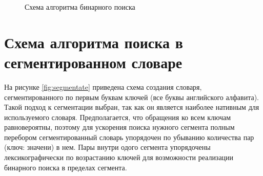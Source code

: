 \begin{figure}[h!]
	
	
	\caption{Схема алгоритма бинарного поиска}
	
	\label{fig:binary_search}
	
\end{figure}

\clearpage
\section{Схема алгоритма поиска в сегментированном словаре}

На рисунке \ref{fig:segmentate} приведена схема создания словаря, сегментированного по первым буквам ключей (все буквы английского алфавита). Такой подход к сегментации выбран, так как он является наиболее нативным для используемого словаря. Предполагается, что обращения ко всем ключам равновероятны, поэтому для ускорения поиска нужного сегмента полным перебором сегментированный словарь упорядочен по убыванию количества пар (ключ: значени) в нем. Пары внутри одого сегмента упорядочены лексикографически по возрастанию ключей для возможности реализации бинарного поиска в пределах сегмента.

